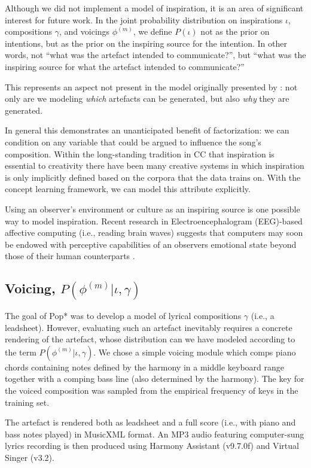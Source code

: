 \documentclass[letterpaper]{article}
\begin{document}
Although we did not implement a model of inspiration, it is an area of significant interest for future work. In the joint probability distribution on inspirations $\iota$, compositions $\gamma$, and voicings $\phi^{(m)}$, we define $P(\iota)$ not as the prior on intentions, but as the prior on the inspiring source for the intention. In other words, not ``what was the artefact intended to communicate?'', but ``what was the inspiring source for what the artefact intended to communicate?''

This represents an aspect not present in the model originally presented by \cite{lake2014thesis}: not only are we modeling \textit{which} artefacts can be generated, but also \textit{why} they are generated. 

In general this demonstrates an unanticipated benefit of factorization: we can condition on any variable that could be argued to influence the song's composition. Within the long-standing tradition in CC that inspiration is essential to creativity there have been many creative systems in which inspiration is only implicitly defined based on the corpora that the data trains on. With the concept learning framework, we can model this attribute explicitly.

Using an observer's environment or culture as an inspiring source is one possible way to model inspiration. Recent research in Electroencephalogram (EEG)-based affective computing (i.e., reading brain waves) suggests that computers may soon be endowed with perceptive capabilities of an observers emotional state beyond those of their human counterparts \cite{volioti2016mapping}.

\subsection{Voicing, $P(\phi^{(m)}|\iota,\gamma)$}

The goal of Pop* was to develop a model of lyrical compositions $\gamma$ (i.e., a leadsheet). However, evaluating such an artefact inevitably requires a concrete rendering of the artefact, whose distribution can we have modeled according to the term $P(\phi^{(m)}|\iota,\gamma)$. We chose a simple voicing module which comps piano chords containing notes defined by the harmony in a middle keyboard range together with a comping bass line (also determined by the harmony). The key for the voiced composition was sampled from the empirical frequency of keys in the training set. 

The artefact is rendered both as leadsheet and a full score (i.e., with piano and bass notes played) in MusicXML format. An MP3 audio featuring computer-sung lyrics recording is then produced using Harmony Assistant (v9.7.0f) and Virtual Singer (v3.2).
\end{document}
